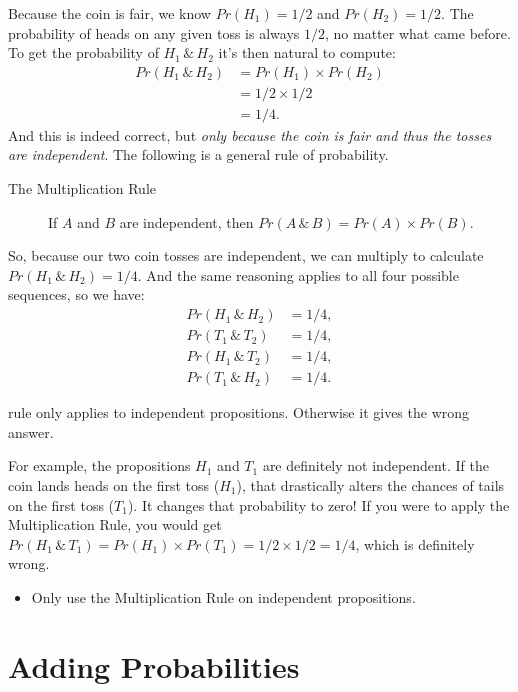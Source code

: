 \documentclass[justified]{tufte-book}
\newenvironment{warning}{\begin{itemize}\item[\faBan]}{\end{itemize}}
\theoremstyle{definition}
\theoremstyle{definition}
\theoremstyle{definition}
\theoremstyle{definition}
\theoremstyle{remark}
\begin{document}
Because the coin is fair, we know \(Pr(H_1) = 1/2\) and \(Pr(H_2) = 1/2\). The probability of heads on any given toss is always \(1/2\), no matter what came before. To get the probability of \(H_1 \,\&\, H_2\) it's then natural to compute:
\[
  \begin{aligned}
    Pr(H_1 \,\&\, H_2) &= Pr(H_1) \times Pr(H_2)\\
                       &= 1/2 \times 1/2\\
                       &= 1/4.
  \end{aligned}
\]
And this is indeed correct, but \emph{only because the coin is fair and thus the tosses are independent}. The following is a general rule of probability.

\begin{description}
\item[The Multiplication Rule]
If \(A\) and \(B\) are independent, then \(Pr(A \,\&\, B) = Pr(A) \times Pr(B)\).
\end{description}

So, because our two coin tosses are independent, we can multiply to calculate \(Pr(H_1 \,\&\, H_2) = 1/4\). And the same reasoning applies to all four possible sequences, so we have:
\[
  \begin{aligned}
    Pr(H_1 \,\&\, H_2) &= 1/4,\\
    Pr(T_1 \,\&\, T_2) &= 1/4,\\
    Pr(H_1 \,\&\, T_2) &= 1/4,\\
    Pr(T_1 \,\&\, H_2) &= 1/4.
  \end{aligned}
\]

 rule only applies to independent propositions. Otherwise it gives the wrong answer.

For example, the propositions \(H_1\) and \(T_1\) are definitely not independent. If the coin lands heads on the first toss (\(H_1\)), that drastically alters the chances of tails on the first toss (\(T_1\)). It changes that probability to zero! If you were to apply the Multiplication Rule, you would get \(Pr(H_1 \,\&\, T_1) = Pr(H_1) \times Pr(T_1) = 1/2 \times 1/2 = 1/4\), which is definitely wrong.

\begin{warning}
Only use the Multiplication Rule on independent propositions.
\end{warning}

\hypertarget{adding-probabilities}{%
\section{Adding Probabilities}\label{adding-probabilities}}
\end{document}
